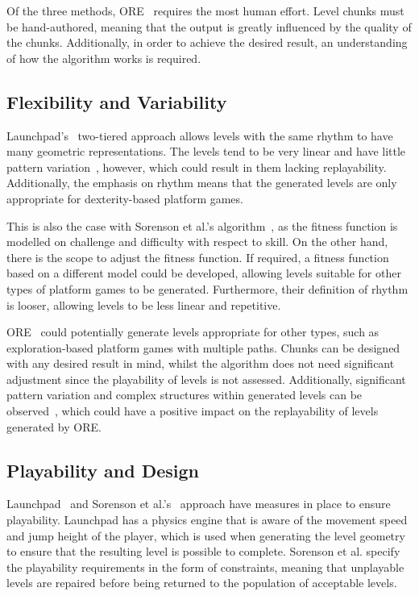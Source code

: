 \documentclass{scrartcl}
\begin{document}
Of the three methods, ORE~\cite{mawhorter:occupancy} requires the most human effort. Level chunks must be hand-authored, meaning that the output is greatly influenced by the quality of the chunks. Additionally, in order to achieve the desired result, an understanding of how the algorithm works is required.


\subsection{Flexibility and Variability}
Launchpad's~\cite{smith:launchpad} two-tiered approach allows levels with the same rhythm to have many geometric representations. The levels tend to be very linear and have little pattern variation~\cite{horn:comparative}, however, which could result in them lacking replayability. Additionally, the emphasis on rhythm means that the generated levels are only appropriate for dexterity-based platform games.

This is also the case with Sorenson et al.'s algorithm~\cite{sorenson:generic}, as the fitness function is modelled on challenge and difficulty with respect to skill. On the other hand, there is the scope to adjust the fitness function. If required, a fitness function based on a different model could be developed, allowing levels suitable for other types of platform games to be generated. Furthermore, their definition of rhythm is looser, allowing levels to be less linear and repetitive.

ORE~\cite{mawhorter:occupancy} could potentially generate levels appropriate for other types, such as exploration-based platform games with multiple paths. Chunks can be designed with any desired result in mind, whilst the algorithm does not need significant adjustment since the playability of levels is not assessed. Additionally, significant pattern variation and complex structures within generated levels can be observed~\cite{horn:comparative}, which could have a positive impact on the replayability of levels generated by ORE.


\subsection{Playability and Design} 
Launchpad~\cite{smith:launchpad} and Sorenson et al.'s~\cite{sorenson:generic} approach have measures in place to ensure playability. Launchpad has a physics engine that is aware of the movement speed and jump height of the player, which is used when generating the level geometry to ensure that the resulting level is possible to complete.
Sorenson et al. specify the playability requirements in the form of constraints, meaning that unplayable levels are repaired before being returned to the population of acceptable levels. 
\end{document}
